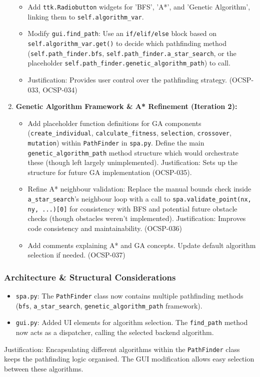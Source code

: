 \begin{enumerate}
\begin{itemize}
		\item Add \verb|ttk.Radiobutton| widgets for 'BFS', 'A*', and 'Genetic Algorithm', linking them to \verb|self.algorithm_var|.
		\item Modify \verb|gui.find_path|: Use an \verb|if/elif/else| block based on \verb|self.algorithm_var.get()| to decide which pathfinding method (\verb|self.path_finder.bfs|, \verb|self.path_finder.a_star_search|, or the placeholder \verb|self.path_finder.genetic_algorithm_path|) to call.
		\item Justification: Provides user control over the pathfinding strategy. (OCSP-033, OCSP-034)
	\end{itemize}
	\item \textbf{Genetic Algorithm Framework \& A* Refinement (Iteration 2):}
	\begin{itemize}
		\item Add placeholder function definitions for GA components (\verb|create_individual|, \verb|calculate_fitness|, \verb|selection|, \verb|crossover|, \verb|mutation|) within \verb|PathFinder| in \verb|spa.py|. Define the main \verb|genetic_algorithm_path| method structure which would orchestrate these (though left largely unimplemented). Justification: Sets up the structure for future GA implementation (OCSP-035).
		\item Refine A* neighbour validation: Replace the manual bounds check inside \verb|a_star_search|'s neighbour loop with a call to \verb|spa.validate_point(nx, ny, ...)[0]| for consistency with BFS and potential future obstacle checks (though obstacles weren't implemented). Justification: Improves code consistency and maintainability. (OCSP-036)
		\item Add comments explaining A* and GA concepts. Update default algorithm selection if needed. (OCSP-037)
	\end{itemize}
\end{enumerate}

\subsubsection{Architecture \& Structural Considerations}
\begin{itemize}
	\item \verb|spa.py|: The \verb|PathFinder| class now contains multiple pathfinding methods (\verb|bfs|, \verb|a_star_search|, \verb|genetic_algorithm_path| framework).
	\item \verb|gui.py|: Added UI elements for algorithm selection. The \verb|find_path| method now acts as a dispatcher, calling the selected backend algorithm.
\end{itemize}
Justification: Encapsulating different algorithms within the \verb|PathFinder| class keeps the pathfinding logic organised. The GUI modification allows easy selection between these algorithms.

